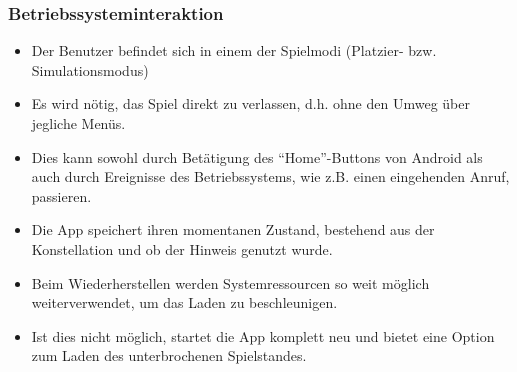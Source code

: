 \subsubsection{Betriebssysteminteraktion}
\begin{itemize}
\item Der Benutzer befindet sich in einem der Spielmodi (Platzier- bzw. 
Simulationsmodus)
\item Es wird nötig, das Spiel direkt zu verlassen, d.h. ohne den Umweg über jegliche Menüs.
\item Dies kann sowohl durch Betätigung des "`Home"'-Buttons von Android als auch durch
Ereignisse des Betriebssystems, wie z.B. einen eingehenden Anruf, passieren.

\item Die App speichert ihren momentanen Zustand, bestehend aus der Konstellation und ob der Hinweis genutzt wurde.
\item Beim Wiederherstellen werden Systemressourcen so weit möglich weiterverwendet, um das Laden zu beschleunigen.
\item Ist dies nicht möglich, startet die App komplett neu und bietet eine Option zum Laden des unterbrochenen Spielstandes.
\end{itemize}
